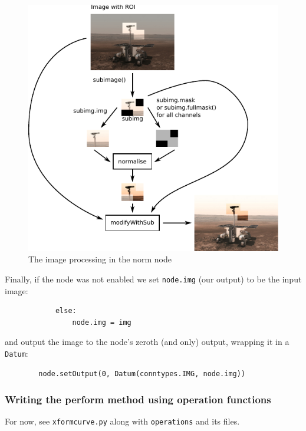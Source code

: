 \begin{figure}[ht]
\center
\includegraphics[width=5in]{norm.pdf}
\caption{The image processing in the norm node}
\label{norm.pdf}
\end{figure}
\clearpage
Finally, if the node was not enabled we set \texttt{node.img} (our output)
to be the input image:
\begin{lstlisting}
            else:
                node.img = img
\end{lstlisting}
and output the image to the node's zeroth (and only) output, wrapping it in
a \texttt{Datum}:
\begin{lstlisting}
        node.setOutput(0, Datum(conntypes.IMG, node.img))
\end{lstlisting}


\subsubsection{Writing the perform method using operation functions}
\begin{notebox}
For now, see \texttt{xformcurve.py} along with \texttt{operations} and its 
files.
\end{notebox}

